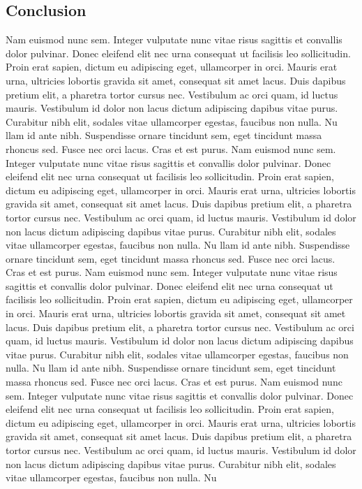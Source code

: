 \documentclass[10pt]{article}
\begin{document}
\begin{multicols*}{2}
\section{Conclusion}
Nam euismod nunc sem. Integer vulputate nunc vitae risus sagittis et convallis dolor pulvinar. Donec eleifend elit nec urna consequat ut facilisis leo sollicitudin. Proin erat sapien, dictum eu adipiscing eget, ullamcorper in orci. Mauris erat urna, ultricies lobortis gravida sit amet, consequat sit amet lacus. Duis dapibus pretium elit, a pharetra tortor cursus nec. Vestibulum ac orci quam, id luctus mauris. Vestibulum id dolor non lacus dictum adipiscing dapibus vitae purus. Curabitur nibh elit, sodales vitae ullamcorper egestas, faucibus non nulla. Nu
llam id ante nibh. Suspendisse ornare tincidunt sem, eget tincidunt massa rhoncus sed. Fusce nec orci lacus. Cras et est purus.
Nam euismod nunc sem. Integer vulputate nunc vitae risus sagittis et convallis dolor pulvinar. Donec eleifend elit nec urna consequat ut facilisis leo sollicitudin. Proin erat sapien, dictum eu adipiscing eget, ullamcorper in orci. Mauris erat urna, ultricies lobortis gravida sit amet, consequat sit amet lacus. Duis dapibus pretium elit, a pharetra tortor cursus nec. Vestibulum ac orci quam, id luctus mauris. Vestibulum id dolor non lacus dictum adipiscing dapibus vitae purus. Curabitur nibh elit, sodales vitae ullamcorper egestas, faucibus non nulla. Nu
llam id ante nibh. Suspendisse ornare tincidunt sem, eget tincidunt massa rhoncus sed. Fusce nec orci lacus. Cras et est purus.
Nam euismod nunc sem. Integer vulputate nunc vitae risus sagittis et convallis dolor pulvinar. Donec eleifend elit nec urna consequat ut facilisis leo sollicitudin. Proin erat sapien, dictum eu adipiscing eget, ullamcorper in orci. Mauris erat urna, ultricies lobortis gravida sit amet, consequat sit amet lacus. Duis dapibus pretium elit, a pharetra tortor cursus nec. Vestibulum ac orci quam, id luctus mauris. Vestibulum id dolor non lacus dictum adipiscing dapibus vitae purus. Curabitur nibh elit, sodales vitae ullamcorper egestas, faucibus non nulla. Nu
llam id ante nibh. Suspendisse ornare tincidunt sem, eget tincidunt massa rhoncus sed. Fusce nec orci lacus. Cras et est purus.
Nam euismod nunc sem. Integer vulputate nunc vitae risus sagittis et convallis dolor pulvinar. Donec eleifend elit nec urna consequat ut facilisis leo sollicitudin. Proin erat sapien, dictum eu adipiscing eget, ullamcorper in orci. Mauris erat urna, ultricies lobortis gravida sit amet, consequat sit amet lacus. Duis dapibus pretium elit, a pharetra tortor cursus nec. Vestibulum ac orci quam, id luctus mauris. Vestibulum id dolor non lacus dictum adipiscing dapibus vitae purus. Curabitur nibh elit, sodales vitae ullamcorper egestas, faucibus non nulla. Nu

\end{multicols*}
\end{document}
